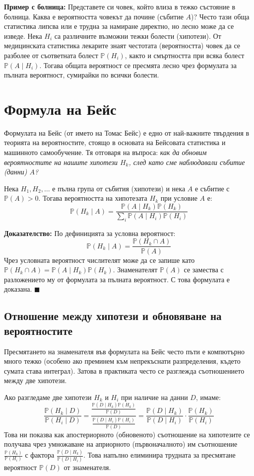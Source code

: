 \documentclass{article}
\begin{document}
\textbf{Пример с болница:}
Представете си човек, който влиза в тежко състояние в болница. Каква е вероятността човекът да почине (събитие $A$)? Често тази обща статистика липсва или е трудна за намиране директно, но лесно може да се изведе. Нека $H_i$ са различните възможни тежки болести (хипотези). От медицинската статистика лекарите знаят честотата (вероятността) човек да се разболее от съответната болест $\mathbb{P}(H_i)$, както и смъртността при всяка болест $\mathbb{P}(A \mid H_i)$. Тогава общата вероятност се пресмята лесно чрез формулата за пълната вероятност, сумирайки по всички болести.

\section{Формула на Бейс}

Формулата на Бейс (от името на Томас Бейс) е едно от най-важните твърдения в теорията на вероятностите, стоящо в основата на Бейсовата статистика и машинното самообучение. Тя отговаря на въпроса: \emph{как да обновим вероятностите на нашите хипотези $H_k$, след като сме наблюдавали събитие (данни) $A$?}

Нека $H_1, H_2, \dots$ е пълна група от събития (хипотези) и нека $A$ е събитие с $\mathbb{P}(A) > 0$. Тогава вероятността на хипотезата $H_k$ при условие $A$ е:
\[
\mathbb{P}(H_k \mid A) = \frac{\mathbb{P}(A \mid H_k)\mathbb{P}(H_k)}{\sum_{i} \mathbb{P}(A \mid H_i)\mathbb{P}(H_i)}
\]

\textbf{Доказателство:}
По дефиницията за условна вероятност:
\[
\mathbb{P}(H_k \mid A) = \frac{\mathbb{P}(H_k \cap A)}{\mathbb{P}(A)}
\]
Чрез условната вероятност числителят може да се запише като $\mathbb{P}(H_k \cap A) = \mathbb{P}(A \mid H_k)\mathbb{P}(H_k)$. Знаменателят $\mathbb{P}(A)$ се замества с разложението му от формулата за пълната вероятност. С това формулата е доказана. $\blacksquare$

\subsection{Отношение между хипотези и обновяване на вероятностите}

Пресмятането на знаменателя във формулата на Бейс често пъти е компютърно много тежко (особено ако преминем към непрекъснати разпределения, където сумата става интеграл). Затова в практиката често се разглежда съотношението между две хипотези. 

Ако разгледаме две хипотези $H_k$ и $H_i$ при наличие на данни $D$, имаме:
\[
\frac{\mathbb{P}(H_k \mid D)}{\mathbb{P}(H_i \mid D)} = \frac{\frac{\mathbb{P}(D \mid H_k)\mathbb{P}(H_k)}{\mathbb{P}(D)}}{\frac{\mathbb{P}(D \mid H_i)\mathbb{P}(H_i)}{\mathbb{P}(D)}} = \frac{\mathbb{P}(D \mid H_k)}{\mathbb{P}(D \mid H_i)} \cdot \frac{\mathbb{P}(H_k)}{\mathbb{P}(H_i)}
\]
Това ни показва как апостериорното (обновеното) съотношение на хипотезите се получава чрез умножаване на априорното (първоначалното) им съотношение $\frac{\mathbb{P}(H_k)}{\mathbb{P}(H_i)}$ с фактора $\frac{\mathbb{P}(D \mid H_k)}{\mathbb{P}(D \mid H_i)}$. Това напълно елиминира трудната за пресмятане вероятност $\mathbb{P}(D)$ от знаменателя.
\end{document}
